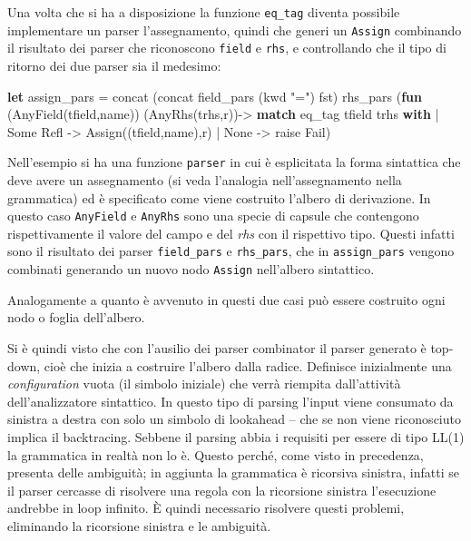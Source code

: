 \documentclass[]{article}
\newenvironment{Shaded}{}{}
\newcommand{\DataTypeTok}[1]{\textcolor[rgb]{0.56,0.13,0.00}{#1}}
\newcommand{\KeywordTok}[1]{\textcolor[rgb]{0.00,0.44,0.13}{\textbf{#1}}}
\newcommand{\NormalTok}[1]{#1}
\newcommand{\StringTok}[1]{\textcolor[rgb]{0.25,0.44,0.63}{#1}}
\begin{document}
Una volta che si ha a disposizione la funzione \texttt{eq\_tag} diventa
possibile implementare un parser l'assegnamento, quindi che generi un
\texttt{Assign} combinando il risultato dei parser che riconoscono
\texttt{field} e \texttt{rhs}, e controllando che il tipo di ritorno dei
due parser sia il medesimo:

\begin{Shaded}
\begin{Highlighting}[]
\KeywordTok{let}\NormalTok{ assign_pars =}
\NormalTok{ concat (concat field_pars (kwd }\StringTok{"="}\NormalTok{) }\DataTypeTok{fst}\NormalTok{) rhs_pars}
\NormalTok{ (}\KeywordTok{fun}\NormalTok{ (AnyField(tfield,name)) (AnyRhs(trhs,r))-> }
 \KeywordTok{match}\NormalTok{ eq_tag tfield trhs }\KeywordTok{with}
\NormalTok{ | }\DataTypeTok{Some}\NormalTok{ Refl -> Assign((tfield,name),r)}
\NormalTok{ | }\DataTypeTok{None}\NormalTok{ -> }\DataTypeTok{raise}\NormalTok{ Fail)}
\end{Highlighting}
\end{Shaded}

Nell'esempio si ha una funzione \texttt{parser} in cui è esplicitata la
forma sintattica che deve avere un assegnamento (si veda l'analogia
nell'assegnamento nella grammatica) ed è specificato come viene
costruito l'albero di derivazione. In questo caso \texttt{AnyField} e
\texttt{AnyRhs} sono una specie di capsule che contengono
rispettivamente il valore del campo e del \emph{rhs} con il rispettivo
tipo. Questi infatti sono il risultato dei parser \texttt{field\_pars} e
\texttt{rhs\_pars}, che in \texttt{assign\_pars} vengono combinati
generando un nuovo nodo \texttt{Assign} nell'albero sintattico.

Analogamente a quanto è avvenuto in questi due casi può essere costruito
ogni nodo o foglia dell'albero.

Si è quindi visto che con l'ausilio dei parser combinator il parser
generato è top-down, cioè che inizia a costruire l'albero dalla radice.
Definisce inizialmente una \emph{configuration} vuota (il simbolo
iniziale) che verrà riempita dall'attività dell'analizzatore sintattico.
In questo tipo di parsing l'input viene consumato da sinistra a destra
con solo un simbolo di lookahead -- che se non viene riconosciuto
implica il backtracing. Sebbene il parsing abbia i requisiti per essere
di tipo LL(1) la grammatica in realtà non lo è. Questo perché, come
visto in precedenza, presenta delle ambiguità; in aggiunta la grammatica
è ricorsiva sinistra, infatti se il parser cercasse di risolvere una
regola con la ricorsione sinistra l'esecuzione andrebbe in loop
infinito. È quindi necessario risolvere questi problemi, eliminando la
ricorsione sinistra e le ambiguità.
\end{document}
